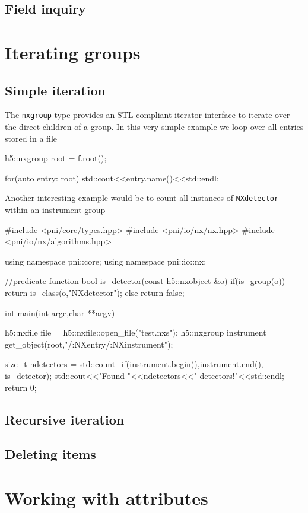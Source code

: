 \subsection{Field inquiry}

\section{Iterating groups}\label{section:group_iteration}

\subsection{Simple iteration}

The {\tt nxgroup} type provides an STL compliant iterator interface to iterate
over the direct children of a group. In this very simple example we loop over 
all entries stored in a file
\begin{cppcode}
h5::nxgroup root = f.root();

for(auto entry: root)
    std::cout<<entry.name()<<std::endl;
\end{cppcode}
Another interesting example would be to count all instances of {\tt NXdetector} 
within an instrument group
\begin{cppcode}
#include <pni/core/types.hpp>
#include <pni/io/nx/nx.hpp>
#include <pni/io/nx/algorithms.hpp>

using namespace pni::core;
using namespace pni::io::nx;

//predicate function
bool is_detector(const h5::nxobject &o)
{
    if(is_group(o)) return is_class(o,"NXdetector");
    else return false;
}

int main(int argc,char **argv)
{
    h5::nxfile file = h5::nxfile::open_file("test.nxs");
    h5::nxgroup instrument = get_object(root,"/:NXentry/:NXinstrument");

    size_t ndetectors = std::count_if(instrument.begin(),instrument.end(),
                                      is_detector);
    std::cout<<"Found "<<ndetectors<<" detectors!"<<std::endl;
    return 0;
}
\end{cppcode}

\subsection{Recursive iteration}

\subsection{Deleting items}



\section{Working with attributes}



